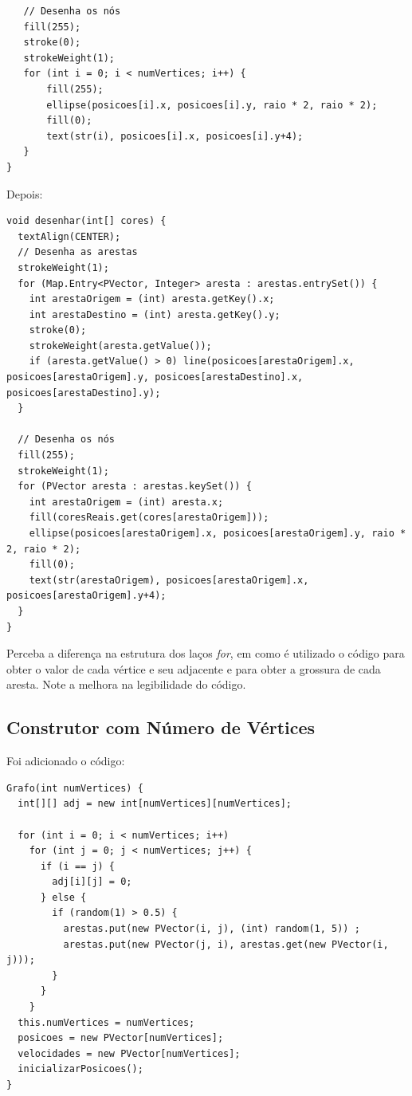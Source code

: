 \documentclass[
	12pt,				%
	oneside,			%
	a4paper,			%
	english,			%
	brazil,				%
	]{abntex2}
\begin{document}
{\begin{verbatim}
   // Desenha os nós
   fill(255);
   stroke(0);
   strokeWeight(1);
   for (int i = 0; i < numVertices; i++) {
       fill(255);
       ellipse(posicoes[i].x, posicoes[i].y, raio * 2, raio * 2);
       fill(0);
       text(str(i), posicoes[i].x, posicoes[i].y+4);
   }
}
\end{verbatim}


Depois:


\begin{verbatim}
void desenhar(int[] cores) {
  textAlign(CENTER);
  // Desenha as arestas
  strokeWeight(1);
  for (Map.Entry<PVector, Integer> aresta : arestas.entrySet()) {
    int arestaOrigem = (int) aresta.getKey().x;
    int arestaDestino = (int) aresta.getKey().y;
    stroke(0);
    strokeWeight(aresta.getValue());
    if (aresta.getValue() > 0) line(posicoes[arestaOrigem].x, posicoes[arestaOrigem].y, posicoes[arestaDestino].x, posicoes[arestaDestino].y);
  }

  // Desenha os nós
  fill(255);
  strokeWeight(1);
  for (PVector aresta : arestas.keySet()) {
    int arestaOrigem = (int) aresta.x;
    fill(coresReais.get(cores[arestaOrigem]));
    ellipse(posicoes[arestaOrigem].x, posicoes[arestaOrigem].y, raio * 2, raio * 2);
    fill(0);
    text(str(arestaOrigem), posicoes[arestaOrigem].x, posicoes[arestaOrigem].y+4);
  }
}
\end{verbatim}

Perceba a diferença na estrutura dos laços \textit{for}, em como é utilizado o código para obter o valor de cada vértice e seu adjacente e para obter a grossura de cada aresta. Note a melhora na legibilidade do código.

\subsection{Construtor com Número de Vértices}

Foi adicionado o código:

\begin{verbatim}
Grafo(int numVertices) {
  int[][] adj = new int[numVertices][numVertices];

  for (int i = 0; i < numVertices; i++)
    for (int j = 0; j < numVertices; j++) {
      if (i == j) {
        adj[i][j] = 0;
      } else {
        if (random(1) > 0.5) {
          arestas.put(new PVector(i, j), (int) random(1, 5)) ;
          arestas.put(new PVector(j, i), arestas.get(new PVector(i, j)));
        }
      }
    }
  this.numVertices = numVertices;
  posicoes = new PVector[numVertices];
  velocidades = new PVector[numVertices];
  inicializarPosicoes();
}
\end{verbatim}
}
\end{document}

